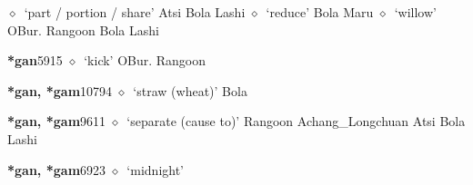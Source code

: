 \begin{list}{}{\leftmargin=1.5em \itemindent=-1.5em}
         $\diamond$~`part / portion / share'
         Atsi 
\hspace{1ex}
         Bola 
\hspace{1ex}
         Lashi 
\hspace{1ex}
         $\diamond$~`reduce'
         Bola 
\hspace{1ex}
         Maru 
\hspace{1ex}
         $\diamond$~`willow'
         OBur. 
\hspace{1ex}
         Rangoon 
\hspace{1ex}
         Bola 
\hspace{1ex}
         Lashi 
  \item {\footnotesize \textbf{*gan}}{\tiny 5915}
\hspace{1ex}
         $\diamond$~`kick'
         OBur. 
\hspace{1ex}
         Rangoon 
  \item {\footnotesize \textbf{*gan, *gam}}{\tiny 10794}
\hspace{1ex}
         $\diamond$~`straw (wheat)'
         Bola 
  \item {\footnotesize \textbf{*gan, *gam}}{\tiny 9611}
\hspace{1ex}
         $\diamond$~`separate (cause to)'
         Rangoon 
\hspace{1ex}
         Achang\_Longchuan 
\hspace{1ex}
         Atsi 
\hspace{1ex}
         Bola 
\hspace{1ex}
         Lashi 
  \item {\footnotesize \textbf{*gan, *gam}}{\tiny 6923}
\hspace{1ex}
         $\diamond$~`midnight'

\end{list}
